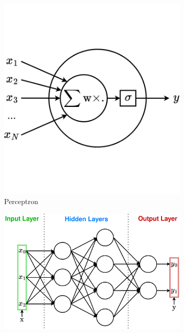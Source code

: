 \begin{figure}[h]
    \centering
    \hfill
    \begin{subfigure}[b]{0.3\textwidth}
        \centering
        \includegraphics[width=\textwidth]{Figures/RL/perceptron.png}
        \caption{Perceptron}
        \label{fig:perceptron}
    \end{subfigure}
    \hfill
    \begin{subfigure}[b]{0.5\textwidth}
        \centering
        \includegraphics[width=\textwidth]{Figures/RL/mlp.png}

\end{subfigure}
\end{figure}
